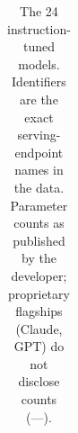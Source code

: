 \documentclass[
]{article}
\begin{document}
{

\begin{longtable}[]{@{}
  >{\raggedright\arraybackslash}p{}
  >{\raggedright\arraybackslash}p{}
  >{\raggedright\arraybackslash}p{}
  >{\raggedleft\arraybackslash}p{}
  >{\raggedright\arraybackslash}p{}
  >{\raggedright\arraybackslash}p{}
  >{\raggedright\arraybackslash}p{}
  >{\raggedright\arraybackslash}p{}
  >{\raggedright\arraybackslash}p{}@{}}

\caption{\label{tbl-models}The 24 instruction-tuned models. Identifiers
are the exact serving-endpoint names in the data. Parameter counts as
published by the developer; proprietary flagships (Claude, GPT) do not
disclose counts (---).}

\tabularnewline


\end{longtable}}
\end{document}
